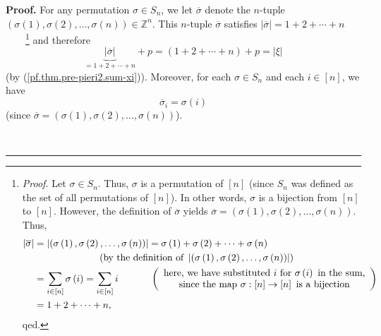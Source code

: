 \documentclass
[numbers=enddot,12pt,final,onecolumn,notitlepage,english]{scrartcl}%
\theoremstyle{definition}
\newenvironment{proof}[1][Proof]{\noindent\textbf{#1.} }{\ \rule{0.5em}{0.5em}}
\let\sumnonlimits\sum
\renewcommand{\sum}{\sumnonlimits\limits}
\newenvironment{verlong}{}{}
\begin{document}
\begin{verlong}
\begin{proof}
For any permutation $\sigma\in S_{n}$, we let $\overline{\sigma}$ denote the
$n$-tuple $\left(  \sigma\left(  1\right)  ,\sigma\left(  2\right)
,\ldots,\sigma\left(  n\right)  \right)  \in\mathbb{Z}^{n}$. This $n$-tuple
$\overline{\sigma}$ satisfies $\left\vert \overline{\sigma}\right\vert
=1+2+\cdots+n$\ \ \ \ \footnote{\textit{Proof.} Let $\sigma\in S_{n}$. Thus,
$\sigma$ is a permutation of $\left[  n\right]  $ (since $S_{n}$ was defined
as the set of all permutations of $\left[  n\right]  $). In other words,
$\sigma$ is a bijection from $\left[  n\right]  $ to $\left[  n\right]  $.
However, the definition of $\overline{\sigma}$ yields $\overline{\sigma
}=\left(  \sigma\left(  1\right)  ,\sigma\left(  2\right)  ,\ldots
,\sigma\left(  n\right)  \right)  $. Thus,%
\begin{align*}
\left\vert \overline{\sigma}\right\vert  &  =\left\vert \left(  \sigma\left(
1\right)  ,\sigma\left(  2\right)  ,\ldots,\sigma\left(  n\right)  \right)
\right\vert =\sigma\left(  1\right)  +\sigma\left(  2\right)  +\cdots
+\sigma\left(  n\right) \\
&  \ \ \ \ \ \ \ \ \ \ \ \ \ \ \ \ \ \ \ \ \left(  \text{by the definition of
}\left\vert \left(  \sigma\left(  1\right)  ,\sigma\left(  2\right)
,\ldots,\sigma\left(  n\right)  \right)  \right\vert \right) \\
&  =\sum_{i\in\left[  n\right]  }\sigma\left(  i\right)  =\sum_{i\in\left[
n\right]  }i\ \ \ \ \ \ \ \ \ \ \left(
\begin{array}
[c]{c}%
\text{here, we have substituted }i\text{ for }\sigma\left(  i\right)  \text{
in the sum,}\\
\text{since the map }\sigma:\left[  n\right]  \rightarrow\left[  n\right]
\text{ is a bijection}%
\end{array}
\right) \\
&  =1+2+\cdots+n,
\end{align*}
qed.} and therefore
\begin{equation}
\underbrace{\left\vert \overline{\sigma}\right\vert }_{=1+2+\cdots
+n}+p=\left(  1+2+\cdots+n\right)  +p=\left\vert \xi\right\vert
\label{pf.thm.pre-pieri2.modsigbar1}%
\end{equation}
(by (\ref{pf.thm.pre-pieri2.sum-xi})). Moreover, for each $\sigma\in S_{n}$
and each $i\in\left[  n\right]  $, we have%
\begin{equation}
\overline{\sigma}_{i}=\sigma\left(  i\right)
\label{pf.thm.pre-pieri2.sigbari}%
\end{equation}
(since $\overline{\sigma}=\left(  \sigma\left(  1\right)  ,\sigma\left(
2\right)  ,\ldots,\sigma\left(  n\right)  \right)  $).


\end{proof}
\end{verlong}
\end{document}
